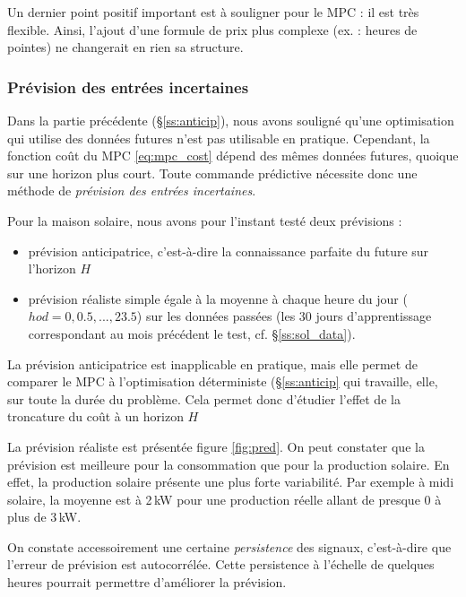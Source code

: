 \documentclass[a4paper,10pt,twocolumn]{article}
\begin{document}
Un dernier point positif important est à souligner pour le MPC :
il est très flexible.
Ainsi, l'ajout d'une formule de prix plus complexe (ex. : heures de pointes)
ne changerait en rien sa structure.

\subsubsection{Prévision des entrées incertaines}

Dans la partie précédente (§\ref{ss:anticip}), nous avons souligné
qu'une optimisation qui utilise des données futures n'est pas utilisable
en pratique. Cependant, la fonction coût du MPC \eqref{eq:mpc_cost} dépend des
mêmes données futures, quoique sur une horizon plus court.
Toute commande prédictive nécessite donc une méthode de \emph{prévision des entrées incertaines}.

Pour la maison solaire, nous avons pour l'instant testé deux prévisions :
\begin{itemize}
 \item prévision anticipatrice, c'est-à-dire la connaissance parfaite du future sur l'horizon $H$
 \item prévision réaliste simple égale à la moyenne à chaque heure du jour
 ($hod = 0, 0.5, ..., 23.5$) sur les données passées
 (les 30 jours d'apprentissage correspondant au mois précédent le test, cf. §\ref{ss:sol_data}).
\end{itemize}

La prévision anticipatrice est inapplicable en pratique, mais elle permet
de comparer le MPC à l'optimisation déterministe (§\ref{ss:anticip} qui travaille,
elle, sur toute la durée du problème.
Cela permet donc d'étudier l'effet de la troncature du coût  à un horizon $H$

La prévision réaliste est présentée figure \ref{fig:pred}.
On peut constater que la prévision est meilleure pour la consommation
que pour la production solaire. En effet, la production solaire présente
une plus forte variabilité. Par exemple à midi solaire, la moyenne est à 2\,kW
pour une production réelle allant de presque 0 à plus de 3\,kW.

On constate accessoirement une certaine \emph{persistence} des signaux,
c'est-à-dire que l'erreur de prévision est autocorrélée.
Cette persistence à l'échelle de quelques heures pourrait permettre
d'améliorer la prévision.
\end{document}

